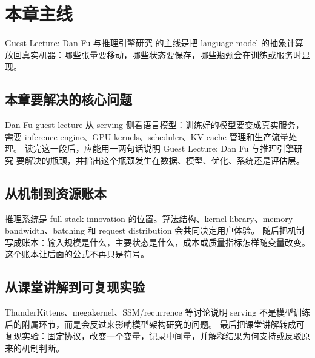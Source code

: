 \documentclass[a4paper]{article}
\begin{document}
\section{本章主线}
Guest Lecture: Dan Fu 与推理引擎研究 的主线是把 language model 的抽象计算放回真实机器：哪些张量要移动，哪些状态要保存，哪些瓶颈会在训练或服务时显现。
\subsection{本章要解决的核心问题}
Dan Fu guest lecture 从 serving 侧看语言模型：训练好的模型要变成真实服务，需要 inference engine、GPU kernels、scheduler、KV cache 管理和生产流量处理。
读完这一段后，应能用一两句话说明 Guest Lecture: Dan Fu 与推理引擎研究 要解决的瓶颈，并指出这个瓶颈发生在数据、模型、优化、系统还是评估层。
\subsection{从机制到资源账本}
推理系统是 full-stack innovation 的位置。算法结构、kernel library、memory bandwidth、batching 和 request distribution 会共同决定用户体验。
随后把机制写成账本：输入规模是什么，主要状态是什么，成本或质量指标怎样随变量改变。这个账本让后面的公式不再只是符号。
\subsection{从课堂讲解到可复现实验}
ThunderKittens、megakernel、SSM/recurrence 等讨论说明 serving 不是模型训练后的附属环节，而是会反过来影响模型架构研究的问题。
最后把课堂讲解转成可复现实验：固定协议，改变一个变量，记录中间量，并解释结果为何支持或反驳原来的机制判断。
\end{document}
